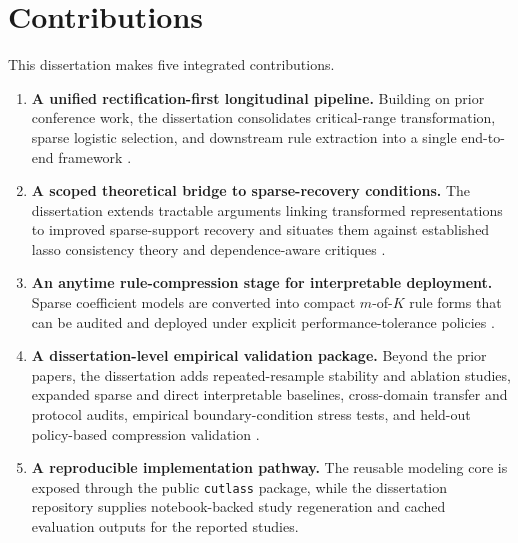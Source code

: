 \section{Contributions}
This dissertation makes five integrated contributions.

\begin{enumerate}
  \item \textbf{A unified rectification-first longitudinal pipeline.} Building on prior conference work, the dissertation consolidates critical-range transformation, sparse logistic selection, and downstream rule extraction into a single end-to-end framework \autocites{orender2022,JOrender2025Efficient}.
  \item \textbf{A scoped theoretical bridge to sparse-recovery conditions.} The dissertation extends tractable arguments linking transformed representations to improved sparse-support recovery and situates them against established lasso consistency theory and dependence-aware critiques \autocites{PZhao2006model,freijeirogonzalez2022,JOrender2025Efficient}.
  \item \textbf{An anytime rule-compression stage for interpretable deployment.} Sparse coefficient models are converted into compact $m$-of-$K$ rule forms that can be audited and deployed under explicit performance-tolerance policies \autocites{JOrender2025Anytime,EAngelino2018Learning}.
  \item \textbf{A dissertation-level empirical validation package.} Beyond the prior papers, the dissertation adds repeated-resample stability and ablation studies, expanded sparse and direct interpretable baselines, cross-domain transfer and protocol audits, empirical boundary-condition stress tests, and held-out policy-based compression validation \autocites{shin2020,sigillito1989}.
  \item \textbf{A reproducible implementation pathway.} The reusable modeling core is exposed through the public \texttt{cutlass} package, while the dissertation repository supplies notebook-backed study regeneration and cached evaluation outputs for the reported studies.
\end{enumerate}


